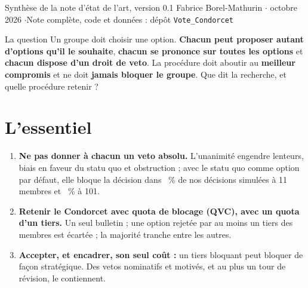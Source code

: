 \documentclass[10pt,a4paper]{article}
\begin{document}
{Synthèse de la note d'état de l'art, version 0.1}
{Fabrice Borel-Mathurin \quad$\cdot$ octobre 2026 \quad$\cdot$\quad Note complète, code et
données : dépôt \texttt{Vote\_Condorcet}}

\begin{keybox}{La question}
Un groupe doit choisir une option. \textbf{Chacun peut proposer autant d'options qu'il le souhaite},
\textbf{chacun se prononce sur toutes les options} et \textbf{chacun dispose d'un droit de veto}. La
procédure doit aboutir au \textbf{meilleur compromis} et ne doit \textbf{jamais bloquer le groupe}. Que
dit la recherche, et quelle procédure retenir ?
\end{keybox}

\section{L'essentiel}
\begin{enumerate}[label=\textbf{\arabic*.}]
  \item \textbf{Ne pas donner à chacun un veto absolu.} L'unanimité engendre lenteurs, biais en faveur
  du statu quo et obstruction ; avec le statu quo comme option par défaut, elle bloque la décision dans
  \KNdeadlockUnanimityEleven~\% de nos décisions simulées à 11 membres et \KNdeadlockUnanimity~\% à 101.
  \item \textbf{Retenir le \og Condorcet avec quota de blocage\fg{} (QVC), avec un quota d'un tiers.} Un
  seul bulletin ; une option rejetée par au moins un tiers des membres est écartée ; la majorité tranche
  entre les autres.
  \item \textbf{Accepter, et encadrer, son seul coût :} un tiers bloquant peut bloquer de façon
  stratégique. Des vetos nominatifs et motivés, et au plus un tour de révision, le contiennent.
\end{enumerate}
\end{document}
